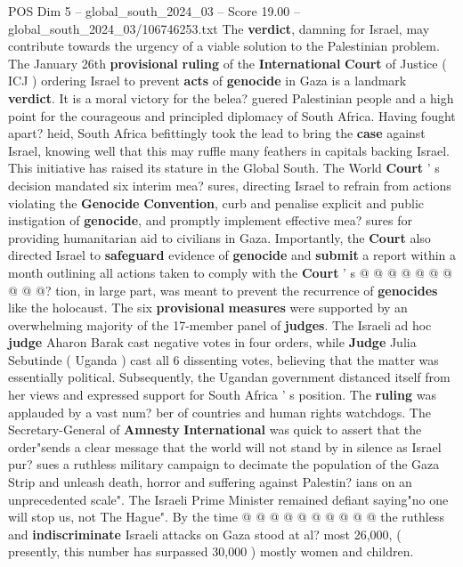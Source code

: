 \begin{textsample}{POS Dim 5 – global\_south\_2024\_03 – Score 19.00 – global\_south\_2024\_03/106746253.txt}  \label{ex:f5_pos_142}
The \textbf{verdict}, damning for Israel, may contribute towards the urgency of a viable solution to the Palestinian problem.
The January 26th \textbf{provisional} \textbf{ruling} of the \textbf{International} \textbf{Court} of Justice ( ICJ ) ordering Israel to prevent \textbf{acts} of \textbf{genocide} in Gaza is a landmark \textbf{verdict}.
It is a moral victory for the belea? guered Palestinian people and a high point for the courageous and principled diplomacy of South Africa.
Having fought apart? heid, South Africa befittingly took the lead to bring the \textbf{case} against Israel, knowing well that this may ruffle many feathers in capitals backing Israel.
This initiative has raised its stature in the Global South.
The World \textbf{Court} ' s decision mandated six interim mea? sures, directing Israel to refrain from actions violating the \textbf{Genocide} \textbf{Convention}, curb and penalise explicit and public instigation of \textbf{genocide}, and promptly implement effective mea? sures for providing humanitarian aid to civilians in Gaza.
Importantly, the \textbf{Court} also directed Israel to \textbf{safeguard} evidence of \textbf{genocide} and \textbf{submit} a report within a month outlining all actions taken to comply with the \textbf{Court} ' s @ @ @ @ @ @ @ @ @ @? tion, in large part, was meant to prevent the recurrence of \textbf{genocides} like the holocaust.
The six \textbf{provisional} \textbf{measures} were supported by an overwhelming majority of the 17-member panel of \textbf{judges}.
The Israeli ad hoc \textbf{judge} Aharon Barak cast negative votes in four orders, while \textbf{Judge} Julia Sebutinde ( Uganda ) cast all 6 dissenting votes, believing that the matter was essentially political.
Subsequently, the Ugandan government distanced itself from her views and expressed support for South Africa ' s position.
The \textbf{ruling} was applauded by a vast num? ber of countries and human rights watchdogs.
The Secretary-General of \textbf{Amnesty} \textbf{International} was quick to assert that the order"sends a clear message that the world will not stand by in silence as Israel pur? sues a ruthless military campaign to decimate the population of the Gaza Strip and unleash death, horror and suffering against Palestin? ians on an unprecedented scale".
The Israeli Prime Minister remained defiant saying"no one will stop us, not The Hague".
By the time @ @ @ @ @ @ @ @ @ @ the ruthless and \textbf{indiscriminate} Israeli attacks on Gaza stood at al? most 26,000, ( presently, this number has surpassed 30,000 ) mostly women and children.

\end{textsample}
